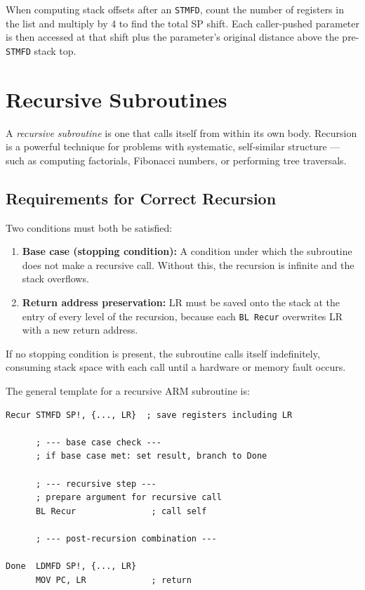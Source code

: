 \documentclass[11pt, a4paper, notitlepage]{report}
\theoremstyle{definition}
\theoremstyle{remark}
\theoremstyle{definition}
\begin{document}
\begin{examtip}[title={Tracing Stack Offsets}]
When computing stack offsets after an \texttt{STMFD}, count the number of registers in the list and multiply by 4 to find the total SP shift. Each caller-pushed parameter is then accessed at that shift plus the parameter's original distance above the pre-\texttt{STMFD} stack top.
\end{examtip}

\section{Recursive Subroutines}

A \emph{recursive subroutine} is one that calls itself from within its own body. Recursion is a powerful technique for problems with systematic, self-similar structure --- such as computing factorials, Fibonacci numbers, or performing tree traversals.

\subsection{Requirements for Correct Recursion}

Two conditions must both be satisfied:

\begin{enumerate}
  \item \textbf{Base case (stopping condition):} A condition under which the subroutine does not make a recursive call. Without this, the recursion is infinite and the stack overflows.
  \item \textbf{Return address preservation:} LR must be saved onto the stack at the entry of every level of the recursion, because each \texttt{BL Recur} overwrites LR with a new return address.
\end{enumerate}

\begin{warning}[title={Infinite Recursion Without a Base Case}]
If no stopping condition is present, the subroutine calls itself indefinitely, consuming stack space with each call until a hardware or memory fault occurs.
\end{warning}

The general template for a recursive ARM subroutine is:

\begin{lstlisting}
Recur STMFD SP!, {..., LR}  ; save registers including LR

      ; --- base case check ---
      ; if base case met: set result, branch to Done

      ; --- recursive step ---
      ; prepare argument for recursive call
      BL Recur               ; call self

      ; --- post-recursion combination ---

Done  LDMFD SP!, {..., LR}
      MOV PC, LR             ; return
\end{lstlisting}
\end{document}
